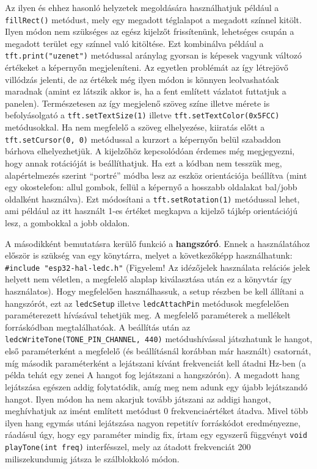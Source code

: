 \documentclass[12pt,a4paper]{article}
\begin{document}
      Az ilyen és ehhez hasonló helyzetek megoldására használhatjuk például a \texttt{fillRect()} metódust, mely egy megadott téglalapot a megadott színnel kitölt. Ilyen módon nem szükséges az egész kijelzőt frissítenünk, lehetséges csupán a megadott terület egy színnel való kitöltése. Ezt kombinálva például a \texttt{tft.print("uzenet")} metódussal aránylag gyorsan is képesek vagyunk változó értékeket a képernyőn megjeleníteni. Az egyetlen problémát az így létrejövő villódzás jelenti, de az értékek még ilyen módon is könnyen leolvashatóak maradnak (amint ez látszik akkor is, ha a fent említett vázlatot futtatjuk a panelen). Természetesen az így megjelenő szöveg színe illetve mérete is befolyásolgató a \texttt{tft.setTextSize(1)} illetve \texttt{tft.setTextColor(0x5FCC)} metódusokkal. Ha nem megfelelő a szöveg elhelyezése, kiiratás előtt a \texttt{tft.setCursor(0, 0)} metódussal a kurzort a képernyőn belül szabaddon bárhova elhelyezhetjük.
      A kijelzőhöz kepcsolódóan érdemes még megjegyezni, hogy annak rotációját is beállíthatjuk. Ha ezt a kódban nem tesszük meg, alapértelmezés szerint ``portré'' módba lesz az eszköz orientációja beállítva (mint egy okostelefon: allul gombok, fellül a képernyő a hosszabb oldalakat bal/jobb oldalként használva). Ezt módosítani a \texttt{tft.setRotation(1)} metódussal lehet, ami például az itt használt 1-es értéket megkapva a kijelző tájkép orientációjú lesz, a gombokkal a jobb oldalon.

      A másodikként bemutatásra kerülő funkció a \textbf{hangszóró}. Ennek a használatához először is szükség van egy könytárra, melyet a következőképp használhatunk: \texttt{\#include "esp32-hal-ledc.h"} (Figyelem! Az idézőjelek használata relációs jelek helyett nem véletlen, a megfelelő alaplap kiválasztása után ez a könyvtár így használatos). Hogy megfelelően használhassuk, a setup részben be kell állítani a hangszórót, ezt az \texttt{ledcSetup} illetve \texttt{ledcAttachPin} metódusok megfelelően paraméterezett hívásával tehetjük meg. A megfelelő paraméterek a mellékelt forráskódban megtalálhatóak.
      A beállítás után az \texttt{ledcWriteTone(TONE\_PIN\_CHANNEL, 440)} metódushívással játszhatunk le hangot, első paraméterként a megfelelő (és beállításnál korábban már használt) csatornát, míg második paraméterként a lejátszani kívánt frekvenciát kell átadni Hz-ben (a példa tehát egy zenei A hangot fog lejátszani a hangszórón). A megadott hang lejátszása egészen addig folytatódik, amíg meg nem adunk egy újabb lejátszandó hangot. Ilyen módon ha nem akarjuk tovább játszani az addigi hangot, meghívhatjuk az imént említett metódust 0 frekvenciaértéket átadva. Mivel több ilyen hang egymás utáni lejátszása nagyon repetitív forráskódot eredményezne, ráadásul úgy, hogy egy paraméter mindig fix, írtam egy egyszerű függvényt \texttt{void playTone(int freq)} interfésszel, mely az átadott frekvenciát 200 miliszekundumig játsza le szálblokkoló módon.
\end{document}
